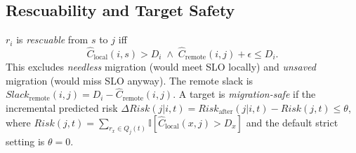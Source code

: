 \subsection{Rescuability and Target Safety}
$r_i$ is \emph{rescuable} from $s$ to $j$ iff
\begin{equation}
\hat{C}_{\text{local}}(i,s) > D_i
\;\wedge\;
\hat{C}_{\text{remote}}(i,j)+\epsilon \le D_i .
\end{equation}
This excludes \emph{needless} migration (would meet SLO locally) and
\emph{unsaved} migration (would miss SLO anyway). The remote slack is
$Slack_{\text{remote}}(i,j)=D_i-\hat{C}_{\text{remote}}(i,j)$.
A target is \emph{migration-safe} if the incremental predicted risk
$\Delta Risk(j|i,t)=Risk_{\text{after}}(j|i,t)-Risk(j,t)\le\theta$,
where $Risk(j,t)=\sum_{r_x\in Q_j(t)}\mathbb{I}[\hat{C}_{\text{local}}
(x,j)>D_x]$ and the default strict setting is $\theta=0$.